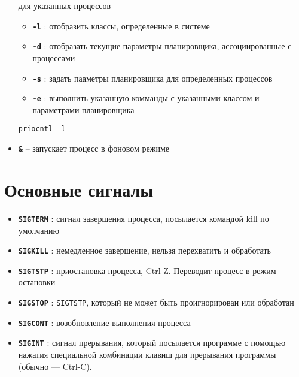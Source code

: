\documentclass[12pt, a4paper]{article}
\begin{document}
\begin{itemize}
    для указанных процессов
    \begin{itemize}
      \item \textbf{\texttt{-l}} : отобразить классы, определенные в системе
      \item \textbf{\texttt{-d}} : отобразать текущие параметры планировщика,
        ассоциированные с процессами
      \item \textbf{\texttt{-s}} : задать пааметры планировщика для определенных
        процессов
      \item \textbf{\texttt{-e}} : выполнить указанную комманды с указанными
        классом и параметрами планировщика
    \end{itemize}
    \texttt{priocntl -l}
  \item \textbf{\texttt{\&}} -- запускает процесс в фоновом режиме
\end{itemize}

\section{Основные сигналы}
\begin{itemize}
  \item \textbf{\texttt{SIGTERM}} : сигнал завершения процесса, посылается командой
    kill по умолчанию
  \item \textbf{\texttt{SIGKILL}} : немедленное завершение, нельзя перехватить
    и обработать
  \item \textbf{\texttt{SIGTSTP}} : приостановка процесса, Ctrl-Z. Переводит
    процесс в режим остановки
  \item \textbf{\texttt{SIGSTOP}} : \texttt{SIGTSTP}, который не может быть
    проигнорирован или обработан
  \item \textbf{\texttt{SIGCONT}} : возобновление выполнения процесса
  \item \textbf{\texttt{SIGINT}} : сигнал прерывания, который посылается программе
    с помощью нажатия специальной комбинации клавиш для прерывания программы
    (обычно — Ctrl-C).
\end{itemize}
\end{document}
